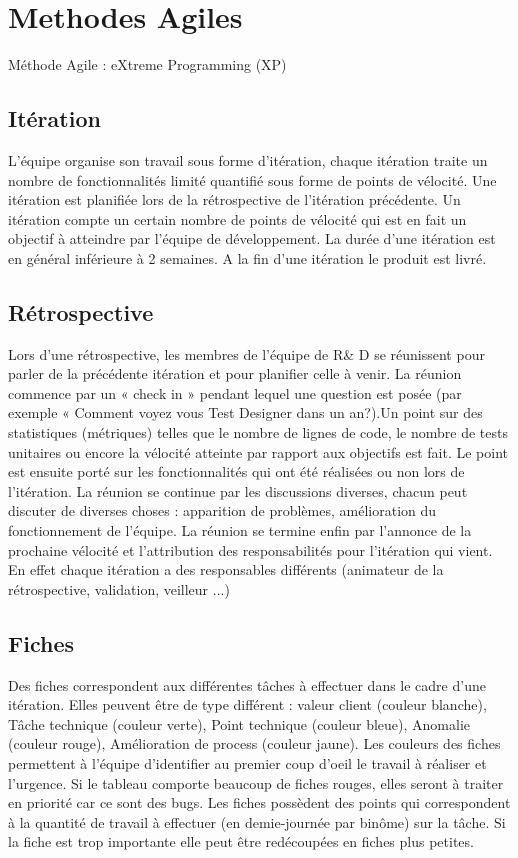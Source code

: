 \documentclass{article}
\begin{document}
\section{Methodes Agiles}
Méthode Agile : eXtreme Programming  (XP)
\subsection{Itération}
L'équipe organise son travail sous forme d'itération, chaque itération traite un nombre de fonctionnalités limité quantifié sous forme de points de vélocité. Une itération est planifiée lors de la rétrospective de l'itération précédente. Un itération compte un certain nombre de points de vélocité qui est en fait un objectif à atteindre par l'équipe de développement. La durée d'une itération est en général inférieure à 2 semaines. A la fin d'une itération le produit est livré.
\subsection{Rétrospective}
Lors d'une rétrospective,  les membres de l'équipe de R\& D se réunissent pour parler de la précédente itération et pour planifier celle à venir. La réunion commence par un « check in » pendant lequel une question est posée (par exemple « Comment voyez vous Test Designer dans un an?).Un point sur des statistiques (métriques) telles que le nombre de lignes de code, le nombre de tests unitaires ou encore la vélocité atteinte par rapport aux objectifs est fait. Le point est ensuite porté sur les fonctionnalités qui ont été réalisées ou non lors de l'itération. La réunion se continue par les discussions diverses, chacun peut discuter de diverses choses : apparition de problèmes, amélioration du fonctionnement de l'équipe. La réunion se termine enfin par l'annonce de la prochaine vélocité et l'attribution des responsabilités pour l'itération qui vient. En effet chaque itération a des responsables différents (animateur de la rétrospective, validation, veilleur ...)
\subsection{Fiches}
Des fiches correspondent aux différentes t\^aches à effectuer dans le cadre d'une itération. Elles peuvent \^etre de type différent : valeur client (couleur blanche), T\^ache technique (couleur verte), Point technique (couleur bleue), Anomalie (couleur rouge), Amélioration de process (couleur jaune). Les couleurs des fiches permettent à l'équipe d'identifier au premier coup d'oeil le travail à réaliser et l'urgence. Si le tableau comporte beaucoup de fiches rouges, elles seront à traiter en priorité car ce sont des bugs. Les fiches possèdent des points qui correspondent à la quantité de travail à effectuer (en demie-journée par bin\^ome) sur la t\^ache. Si la fiche est trop importante elle peut \^etre redécoupées en fiches plus petites.
\end{document}
